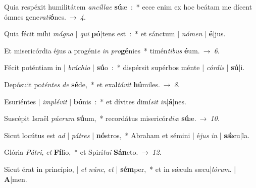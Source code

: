 ﻿\item Quia respéxit humilitátem \emph{an}\-\emph{cíl}\-\emph{lae} \textbf{sú}æ~:~*
ecce enim ex hoc beátam me dícent ómnes gene\emph{ra}\emph{ti}\textbf{ó}nes.~→~\emph{4}.
\item Quia fécit míhi \emph{má}\-\emph{gna} | \emph{qui} \textbf{pó}|tens est~:~*
et sánctum | \emph{nó}\-\emph{men} | \textbf{é}|jus.
\item Et misericórdia éjus a progéni\emph{e} \emph{in} \emph{pro}\textbf{gé}nies~*
timén\emph{ti}\-\emph{bus} \textbf{é}um.~→~\emph{6}.
\item Fécit poténtiam in | \emph{brá}\-\emph{chi}\-\emph{o} | \textbf{sú}o~:~*
dispérsit supérbos ménte | \emph{cór}\-\emph{dis} | \textbf{sú}|i.
\item Depósuit po\emph{tén}\-\emph{tes} \emph{de} \textbf{sé}de,~*
et exal\emph{tá}\-\emph{vit} \textbf{hú}miles.~→~\emph{8}.
\item Esuriéntes | \emph{im}\-\emph{plé}\-\emph{vit} | \textbf{bó}nis~:~*
et dívites dimí\emph{sit} \emph{in}|\textbf{á}|nes.
\item Suscépit Israël \emph{pú}\-\emph{e}\-\emph{rum} \textbf{sú}um,~*
recordátus misericór\emph{di}\-\emph{æ} \textbf{sú}æ.~→~\emph{10}.
\item Sicut locútus est \emph{ad} | \emph{pá}\-\emph{tres} | \textbf{nó}stros,~*
Abraham et sémini | é\emph{jus} \emph{in} | \textbf{sǽ}cu|la.
\item Glória \emph{Pá}\-\emph{tri}, \emph{et} \textbf{Fí}lio,~*
et Spirí\emph{tu}\-\emph{i} \textbf{Sán}cto.~→~\emph{12}.
\item Sicut érat in princípio, | \emph{et} \emph{núnc}, \emph{et} | \textbf{sém}per,~*
et in sǽcula sæcu|\emph{ló}\-\emph{rum}. | \textbf{A}|men.
